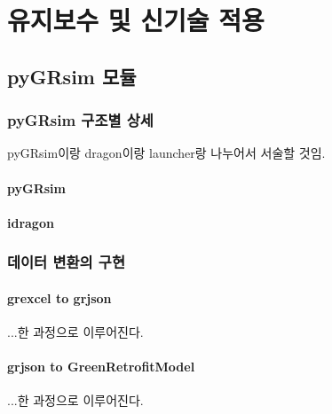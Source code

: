 \part{유지보수 및 신기술 적용}
\label{part:module}


\chapter{pyGRsim 모듈}


\section{pyGRsim 구조별 상세}
pyGRsim이랑 dragon이랑 launcher랑 나누어서 서술할 것임.

\subsection{pyGRsim}

\subsection{idragon}


\section{데이터 변환의 구현}
\subsection{grexcel to grjson}
...한 과정으로 이루어진다.

\subsection{grjson to GreenRetrofitModel}
...한 과정으로 이루어진다.

